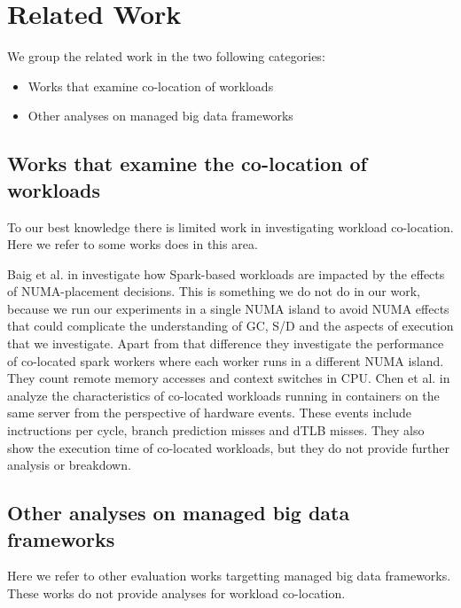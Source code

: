 \section{Related Work}

We group the related work in the two following categories:
\begin{itemize}
\item{Works that examine co-location of workloads}
\item{Other analyses on managed big data frameworks}
\end{itemize}

\subsection{Works that examine the co-location of workloads}
To our best knowledge there is limited work in investigating workload co-location. Here we refer to some works does in this area.


Baig et al. in \cite{NUMA} investigate how Spark-based workloads are impacted by the effects of NUMA-placement decisions. This is something we do not do in our work, because we run our experiments in a single NUMA island to avoid NUMA effects that could complicate the understanding of GC, S/D and the aspects of execution that we investigate. Apart from that difference they investigate the performance of co-located spark workers where each worker runs in a different NUMA island. They count remote memory accesses and context switches in CPU. Chen et al. in \cite{interference} analyze the characteristics of co-located workloads running in containers on the same server from the perspective of hardware events. These events include inctructions per cycle, branch prediction misses and dTLB misses. They also show the execution time of co-located workloads, but they do not provide further analysis or breakdown.

\subsection{Other analyses on managed big data frameworks}

Here we refer to other evaluation works targetting managed big data frameworks.
These works do not provide analyses for workload co-location.

